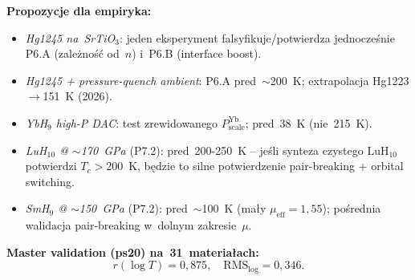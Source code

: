 \medskip\noindent\textbf{Propozycje dla empiryka:}
\begin{itemize}\itemsep0pt
  \item \emph{Hg1245 na~SrTiO$_3$}: jeden eksperyment falsyfikuje/potwierdza
    jednocze\'snie P6.A (zale\.zno\'s\'c od~$n$) i~P6.B (interface boost).
  \item \emph{Hg1245 + pressure-quench ambient}: P6.A pred~$\sim$200~K;
    extrapolacja Hg1223$\to$151~K (2026).
  \item \emph{YbH$_9$ high-P DAC}: test zrewidowanego $P_\text{scale}^\text{Yb}$; pred~38~K (nie~215~K).
  \item \emph{LuH$_{10}$ @ $\sim$170~GPa} (P7.2): pred~200-250~K -- je\'sli synteza czystego LuH$_{10}$
    potwierdzi $T_c\!>\!200$~K, b\k{e}dzie to silne potwierdzenie pair-breaking + orbital switching.
  \item \emph{SmH$_9$ @ $\sim$150~GPa} (P7.2): pred~$\sim$100~K (ma\l{}y $\mu_\text{eff}\!=\!1{,}55$);
    po\'srednia walidacja pair-breaking w~dolnym zakresie~$\mu$.
\end{itemize}

\medskip\noindent\textbf{Master validation (ps20) na~31~materia\l{}ach:}
\[r(\log T)=0{,}875,\quad \text{RMS}_\text{log}=0{,}346.\]

